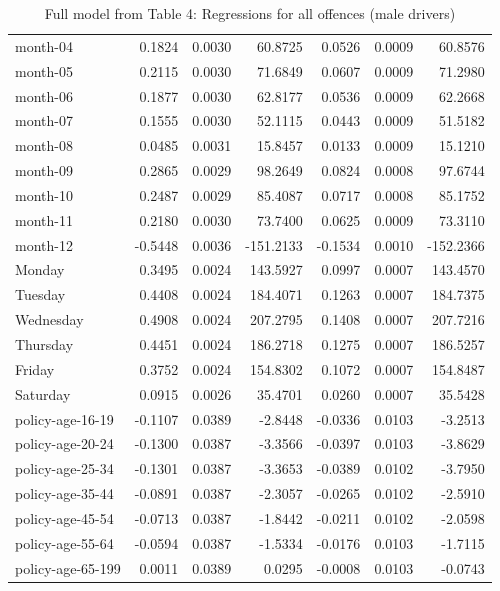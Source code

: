 \documentclass[10pt]{article}
\begin{document}
\begin{table}[ht]
\begin{tabular}{lrrrrrr}
  month-04 & 0.1824 & 0.0030 & 60.8725 & 0.0526 & 0.0009 & 60.8576 \\ 
  month-05 & 0.2115 & 0.0030 & 71.6849 & 0.0607 & 0.0009 & 71.2980 \\ 
  month-06 & 0.1877 & 0.0030 & 62.8177 & 0.0536 & 0.0009 & 62.2668 \\ 
  month-07 & 0.1555 & 0.0030 & 52.1115 & 0.0443 & 0.0009 & 51.5182 \\ 
  month-08 & 0.0485 & 0.0031 & 15.8457 & 0.0133 & 0.0009 & 15.1210 \\ 
  month-09 & 0.2865 & 0.0029 & 98.2649 & 0.0824 & 0.0008 & 97.6744 \\ 
  month-10 & 0.2487 & 0.0029 & 85.4087 & 0.0717 & 0.0008 & 85.1752 \\ 
  month-11 & 0.2180 & 0.0030 & 73.7400 & 0.0625 & 0.0009 & 73.3110 \\ 
  month-12 & -0.5448 & 0.0036 & -151.2133 & -0.1534 & 0.0010 & -152.2366 \\ 
  Monday & 0.3495 & 0.0024 & 143.5927 & 0.0997 & 0.0007 & 143.4570 \\ 
  Tuesday & 0.4408 & 0.0024 & 184.4071 & 0.1263 & 0.0007 & 184.7375 \\ 
  Wednesday & 0.4908 & 0.0024 & 207.2795 & 0.1408 & 0.0007 & 207.7216 \\ 
  Thursday & 0.4451 & 0.0024 & 186.2718 & 0.1275 & 0.0007 & 186.5257 \\ 
  Friday & 0.3752 & 0.0024 & 154.8302 & 0.1072 & 0.0007 & 154.8487 \\ 
  Saturday & 0.0915 & 0.0026 & 35.4701 & 0.0260 & 0.0007 & 35.5428 \\ 
  policy-age-16-19 & -0.1107 & 0.0389 & -2.8448 & -0.0336 & 0.0103 & -3.2513 \\ 
  policy-age-20-24 & -0.1300 & 0.0387 & -3.3566 & -0.0397 & 0.0103 & -3.8629 \\ 
  policy-age-25-34 & -0.1301 & 0.0387 & -3.3653 & -0.0389 & 0.0102 & -3.7950 \\ 
  policy-age-35-44 & -0.0891 & 0.0387 & -2.3057 & -0.0265 & 0.0102 & -2.5910 \\ 
  policy-age-45-54 & -0.0713 & 0.0387 & -1.8442 & -0.0211 & 0.0102 & -2.0598 \\ 
  policy-age-55-64 & -0.0594 & 0.0387 & -1.5334 & -0.0176 & 0.0103 & -1.7115 \\ 
  policy-age-65-199 & 0.0011 & 0.0389 & 0.0295 & -0.0008 & 0.0103 & -0.0743 \\ 
   \hline
\end{tabular}
\caption{Full model from Table 4: Regressions for all offences (male drivers)} 
\label{tab_4_all_pts_M}
\end{table}
\end{document}
